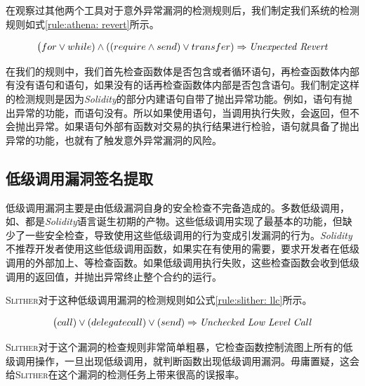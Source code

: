 在观察过其他两个工具对于意外异常漏洞的检测规则后，我们制定我们系统的检测规则如式\ref{rule:athena: revert}所示。
\begin{mdframed}[
	linewidth = 1pt,
	innertopmargin = -5pt,
	innerbottommargin = 3pt,
	outerlinewidth = 1pt
	]
    \small
	\begin{equation} \label{rule:athena: revert}
    \big (for \vee while) \wedge ((require \wedge send) \vee transfer)  \Rightarrow \text{\emph{Unexpected Revert}}
	\end{equation}
\end{mdframed}
在我们的规则中，我们首先检查函数体是否包含或者循环语句，再检查函数体内部有没有语句和语句，如果没有的话再检查函数体内部是否包含语句。我们制定这样的检测规则是因为\emph{Solidity}的部分内建语句自带了抛出异常功能。例如，语句有抛出异常的功能，而语句没有。所以如果使用语句，当调用执行失败，会返回，但不会抛出异常。如果语句外部有函数对交易的执行结果进行检验，语句就具备了抛出异常的功能，也就有了触发意外异常漏洞的风险。

\subsection{低级调用漏洞签名提取}
低级调用漏洞主要是由低级漏洞自身的安全检查不完备造成的。多数低级调用，如、都是\emph{Solidity}语言诞生初期的产物。这些低级调用实现了最基本的功能，但缺少了一些安全检查，导致使用这些低级调用的行为变成引发漏洞的行为。\emph{Solidity}不推荐开发者使用这些低级调用函数，如果实在有使用的需要，要求开发者在低级调用的外部加上、等检查函数。如果低级调用执行失败，这些检查函数会收到低级调用的返回值，并抛出异常终止整个合约的运行。

\textsc{Slither}对于这种低级调用漏洞的检测规则如公式\ref{rule:slither: llc}所示。
\begin{mdframed}[
	linewidth = 1pt,
	innertopmargin = -5pt,
	innerbottommargin = 3pt,
	outerlinewidth = 1pt
	]
    \small
	\begin{equation} \label{rule:slither: llc}
    \big ( call) \vee (delegatecall) \vee (send) \Rightarrow \text{\emph{Unchecked Low Level Call}}
	\end{equation}
\end{mdframed}
\textsc{Slither}对于这个漏洞的检查规则非常简单粗暴，它检查函数控制流图上所有的低级调用操作，一旦出现低级调用，就判断函数出现低级调用漏洞。毋庸置疑，这会给\textsc{Slither}在这个漏洞的检测任务上带来很高的误报率。

